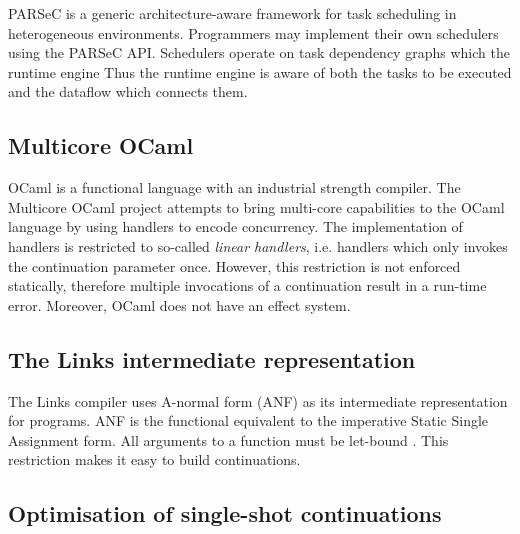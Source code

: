 \documentclass[preprint,10pt,numbers]{sigplanconf}
\begin{document}
PARSeC \cite{Bosilca2013} is a generic architecture-aware framework for task scheduling in heterogeneous environments. Programmers may implement their own schedulers using the PARSeC API. Schedulers operate on task dependency graphs which the runtime engine
Thus the runtime engine is aware of both the tasks to be executed and the dataflow which connects them.

\subsection{Multicore OCaml}
OCaml is a functional language with an industrial strength compiler. The Multicore OCaml project \cite{Dolan2015} attempts to bring multi-core capabilities to the OCaml language by using handlers to encode concurrency. The implementation of handlers is restricted to so-called \emph{linear handlers}, i.e. handlers which only invokes the continuation parameter once. However, this restriction is not enforced statically, therefore multiple invocations of a continuation result in a run-time error. Moreover, OCaml does not have an effect system.

\subsection{The Links intermediate representation}
The Links compiler uses A-normal form (ANF) as its intermediate representation for programs. ANF is the functional equivalent to the imperative Static Single Assignment form. All arguments to a function must be let-bound \cite{Flanagan1993}. This restriction makes it easy to build continuations.

  \subsection{Optimisation of single-shot continuations}
\end{document}
